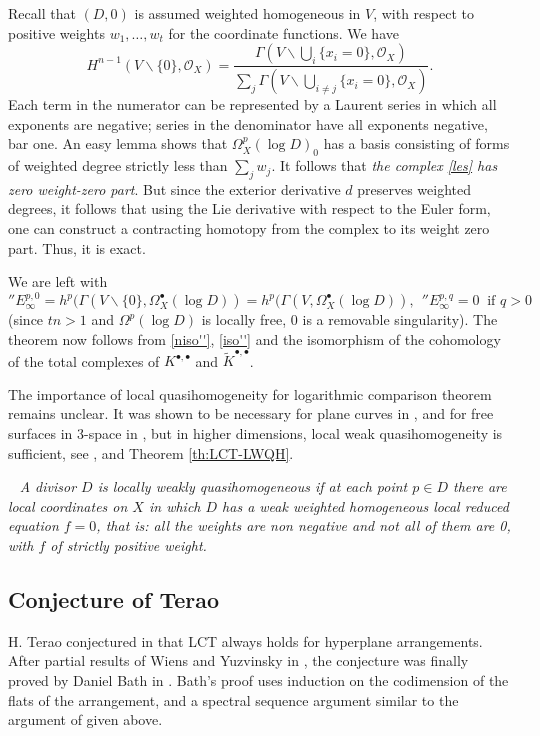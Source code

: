 \documentclass[12pt]{article}
\newcommand{\OO}{\mathcal{O}}
\newcommand\bu{\bullet}
\newcommand\vsn{\vskip 10pt\noindent}
\newcommand\ssm{\smallsetminus}
\newcommand\beq{\begin{equation}}
\newcommand\eeq{\end{equation}}
\newcommand\ld{{\ldots}}
\newcounter{numero}[section]
\renewcommand{\thenumero}{(\arabic{section}.\arabic{numero})}
\newenvironment{definicion}{\medskip
\refstepcounter{numero}\noindent {\sc  \thenumero\ Definition.}\
\it}{\vspace{1ex}\par}
\begin{document}
Recall that $(D,0)$ is assumed weighted homogeneous in $V$, with respect to positive weights $w_1,\ld, w_t$ for the coordinate functions.
We have $$H^{n-1}(V\ssm \{0\},\OO_X)=\frac{\Gamma(V\ssm \bigcup_i\{x_i=0\},\OO_X)}{
\sum_j\Gamma(V\ssm \bigcup_{i\neq j}\{x_i=0\},\OO_X)}.$$
Each term in the numerator can be represented by a Laurent series in which all exponents are negative; series in the denominator have all exponents negative, bar one.  An easy lemma shows that ${\Omega}_X^p(\log D)_0$ has a basis consisting of forms of weighted degree strictly less than
$\sum_jw_j$. It follows that {\it the complex \eqref{les} has zero weight-zero part}. But since the exterior derivative $d$ preserves weighted degrees, it follows that using the Lie derivative with respect to the Euler form, one can construct a contracting homotopy from the complex to its weight zero part. Thus, it is exact.

We are left with
\beq\label{iso''}''E_\infty^{p,0}=h^p(\Gamma(V\ssm\{0\}, \Omega_X^\bu(\log D))=h^p(\Gamma(V, \Omega_X^\bu(\log D)), \ \ ''E_\infty^{p,q}=0\ \text{ if }q>0\eeq
(since $tn>1$ and $\Omega^p(\log D)$ is locally free, $0$ is a removable singularity).
The theorem now follows  from \eqref{niso''}, \eqref{iso''} and the isomorphism of the cohomology of the total complexes of $K^{\bu,\bu}$ and $\tilde K^{\bu,\bu}$.

\vsn
The importance of local quasihomogeneity for logarithmic comparison theorem remains unclear. It was shown to be necessary for plane curves in \cite{cmnc}, and for free surfaces in 3-space in \cite{GrangerSchulze}, but in higher dimensions, local weak quasihomogeneity is sufficient, see \cite{wqh}, \cite[Remark 1.7.4]{nar_comp_08} {and  Theorem \ref{th:LCT-LWQH}}.

\begin{definicion} \label{def:LWQH}
A divisor $D$ is locally weakly quasihomogeneous \cite[Def. 2.1]{wqh} if at each point $p\in D$ there are local coordinates on $X$ in which $D$ has a weak weighted homogeneous local reduced equation $f=0$, that is: all the weights are non negative and not all of them are 0, with $f$ of strictly positive weight.
\end{definicion}


\subsection{Conjecture of Terao}\label{conjecture-of-terao} H. Terao conjectured in \cite[Conjecture 3.1]{terao} that LCT always holds for hyperplane arrangements.  After partial results of Wiens and Yuzvinsky in \cite{wy}, the conjecture was finally proved by Daniel Bath in \cite{Bath2022}. Bath's proof uses induction on the codimension of the flats of the arrangement, and a spectral sequence argument similar to the argument of \cite{CMN} given above.
\end{document}
